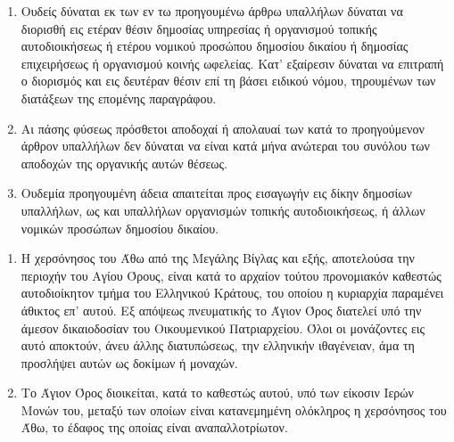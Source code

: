 \documentclass[twoside, a4paper, 10pt]{article}
\begin{document}
\begin{multicols}{2}
\begin{enumerate}
\begin{BigQuote}
\begin{enumerate}
  \item[1.] Ουδείς δύναται εκ των εν τω προηγουμένω άρθρω υπαλλήλων δύναται να διορισθή εις ετέραν θέσιν δημοσίας υπηρεσίας ή οργανισμού τοπικής αυτοδιοικήσεως ή ετέρου νομικού προσώπου δημοσίου δικαίου ή δημοσίας επιχειρήσεως ή οργανισμού κοινής ωφελείας. Κατ' εξαίρεσιν δύναται να επιτραπή ο διορισμός και εις δευτέραν θέσιν επί τη βάσει ειδικού νόμου, τηρουμένων των διατάξεων της επομένης παραγράφου.
  \item[2.] Αι πάσης φύσεως πρόσθετοι αποδοχαί ή απολαυαί των κατά το προηγούμενον άρθρον υπαλλήλων δεν δύναται να είναι κατά μήνα ανώτεραι του συνόλου των αποδοχών της οργανικής αυτών θέσεως.
  \item[3.] Ουδεμία προηγουμένη άδεια απαιτείται προς εισαγωγήν εις δίκην δημοσίων υπαλλήλων, ως και υπαλλήλων οργανισμών τοπικής αυτοδιοικήσεως, ή άλλων νομικών προσώπων δημοσίου δικαίου.
\end{enumerate}

\begin{enumerate}
  \item[1.] Η χερσόνησος του Άθω από της Μεγάλης Βίγλας και εξής, αποτελούσα την περιοχήν του Αγίου Όρους, είναι κατά το αρχαίον τούτου προνομιακόν καθεστώς αυτοδιοίκητον τμήμα του Ελληνικού Κράτους, του οποίου η κυριαρχία παραμένει άθικτος επ' αυτού. Εξ απόψεως  πνευματικής το Άγιον Όρος διατελεί υπό την άμεσον δικαιοδοσίαν του Οικουμενικού Πατριαρχείου. Όλοι οι μονάζοντες εις αυτό αποκτούν, άνευ άλλης διατυπώσεως, την ελληνικήν ιθαγένειαν, άμα τη προσλήψει αυτών ως δοκίμων ή μοναχών.
  \item[2.] Το Άγιον Όρος διοικείται, κατά το καθεστώς αυτού, υπό των είκοσιν Ιερών Μονών του, μεταξύ των οποίων είναι κατανεμημένη ολόκληρος η χερσόνησος του Άθω, το έδαφος της οποίας είναι αναπαλλοτρίωτον.
  

\end{enumerate}
\end{BigQuote}
\end{enumerate}
\end{multicols}
\end{document}
